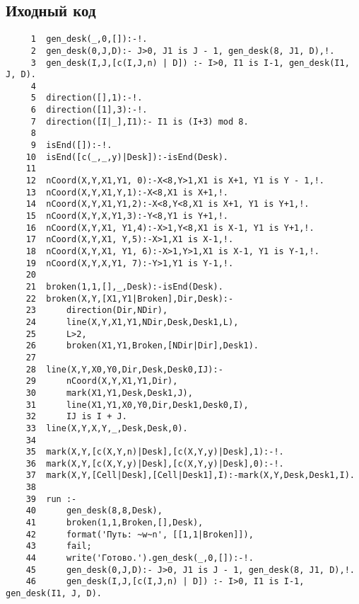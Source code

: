 \subsection{Иходный код}
\begin{verbatim}
     1	gen_desk(_,0,[]):-!.
     2	gen_desk(0,J,D):- J>0, J1 is J - 1, gen_desk(8, J1, D),!.
     3	gen_desk(I,J,[c(I,J,n) | D]) :- I>0, I1 is I-1, gen_desk(I1, J, D). 
     4	
     5	direction([],1):-!.
     6	direction([1],3):-!.
     7	direction([I|_],I1):- I1 is (I+3) mod 8.
     8	
     9	isEnd([]):-!.
    10	isEnd([c(_,_,y)|Desk]):-isEnd(Desk).
    11	
    12	nCoord(X,Y,X1,Y1, 0):-X<8,Y>1,X1 is X+1, Y1 is Y - 1,!.
    13	nCoord(X,Y,X1,Y,1):-X<8,X1 is X+1,!.
    14	nCoord(X,Y,X1,Y1,2):-X<8,Y<8,X1 is X+1, Y1 is Y+1,!.
    15	nCoord(X,Y,X,Y1,3):-Y<8,Y1 is Y+1,!.
    16	nCoord(X,Y,X1, Y1,4):-X>1,Y<8,X1 is X-1, Y1 is Y+1,!.
    17	nCoord(X,Y,X1, Y,5):-X>1,X1 is X-1,!.
    18	nCoord(X,Y,X1, Y1, 6):-X>1,Y>1,X1 is X-1, Y1 is Y-1,!.
    19	nCoord(X,Y,X,Y1, 7):-Y>1,Y1 is Y-1,!.
    20	
    21	broken(1,1,[],_,Desk):-isEnd(Desk).
    22	broken(X,Y,[X1,Y1|Broken],Dir,Desk):-
    23	    direction(Dir,NDir),
    24	    line(X,Y,X1,Y1,NDir,Desk,Desk1,L),
    25		L>2,
    26		broken(X1,Y1,Broken,[NDir|Dir],Desk1).
    27	
    28	line(X,Y,X0,Y0,Dir,Desk,Desk0,IJ):-
    29		nCoord(X,Y,X1,Y1,Dir),
    30	    mark(X1,Y1,Desk,Desk1,J),
    31	    line(X1,Y1,X0,Y0,Dir,Desk1,Desk0,I),
    32		IJ is I + J.
    33	line(X,Y,X,Y,_,Desk,Desk,0).
    34	
    35	mark(X,Y,[c(X,Y,n)|Desk],[c(X,Y,y)|Desk],1):-!.
    36	mark(X,Y,[c(X,Y,y)|Desk],[c(X,Y,y)|Desk],0):-!.
    37	mark(X,Y,[Cell|Desk],[Cell|Desk1],I):-mark(X,Y,Desk,Desk1,I).
    38	
    39	run :-
    40		gen_desk(8,8,Desk),
    41		broken(1,1,Broken,[],Desk),
    42		format('Путь: ~w~n', [[1,1|Broken]]),
    43		fail;
    44		write('Готово.').gen_desk(_,0,[]):-!.
    45		gen_desk(0,J,D):- J>0, J1 is J - 1, gen_desk(8, J1, D),!.
    46		gen_desk(I,J,[c(I,J,n) | D]) :- I>0, I1 is I-1, gen_desk(I1, J, D). 
\end{verbatim}
